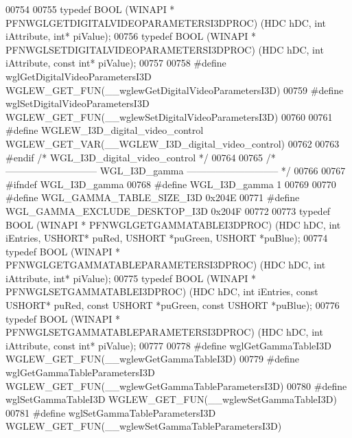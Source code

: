 \begin{DoxyCode}
00754 
00755 \textcolor{keyword}{typedef} BOOL (WINAPI * PFNWGLGETDIGITALVIDEOPARAMETERSI3DPROC) (HDC hDC, \textcolor{keywordtype}{int} 
      iAttribute, \textcolor{keywordtype}{int}* piValue);
00756 \textcolor{keyword}{typedef} BOOL (WINAPI * PFNWGLSETDIGITALVIDEOPARAMETERSI3DPROC) (HDC hDC, \textcolor{keywordtype}{int} 
      iAttribute, \textcolor{keyword}{const} \textcolor{keywordtype}{int}* piValue);
00757 
00758 \textcolor{preprocessor}{#define wglGetDigitalVideoParametersI3D WGLEW\_GET\_FUN(\_\_wglewGetDigitalVideoParametersI3D)}
00759 \textcolor{preprocessor}{#define wglSetDigitalVideoParametersI3D WGLEW\_GET\_FUN(\_\_wglewSetDigitalVideoParametersI3D)}
00760 
00761 \textcolor{preprocessor}{#define WGLEW\_I3D\_digital\_video\_control WGLEW\_GET\_VAR(\_\_WGLEW\_I3D\_digital\_video\_control)}
00762 
00763 \textcolor{preprocessor}{#endif }\textcolor{comment}{/* WGL\_I3D\_digital\_video\_control */}\textcolor{preprocessor}{}
00764 
00765 \textcolor{comment}{/* ----------------------------- WGL\_I3D\_gamma ----------------------------- */}
00766 
00767 \textcolor{preprocessor}{#ifndef WGL\_I3D\_gamma}
00768 \textcolor{preprocessor}{#define WGL\_I3D\_gamma 1}
00769 
00770 \textcolor{preprocessor}{#define WGL\_GAMMA\_TABLE\_SIZE\_I3D 0x204E}
00771 \textcolor{preprocessor}{#define WGL\_GAMMA\_EXCLUDE\_DESKTOP\_I3D 0x204F}
00772 
00773 \textcolor{keyword}{typedef} BOOL (WINAPI * PFNWGLGETGAMMATABLEI3DPROC) (HDC hDC, \textcolor{keywordtype}{int} iEntries, USHORT* 
      puRed, USHORT *puGreen, USHORT *puBlue);
00774 \textcolor{keyword}{typedef} BOOL (WINAPI * PFNWGLGETGAMMATABLEPARAMETERSI3DPROC) (HDC hDC, \textcolor{keywordtype}{int} 
      iAttribute, \textcolor{keywordtype}{int}* piValue);
00775 \textcolor{keyword}{typedef} BOOL (WINAPI * PFNWGLSETGAMMATABLEI3DPROC) (HDC hDC, \textcolor{keywordtype}{int} iEntries, \textcolor{keyword}{const} USHORT* 
      puRed, \textcolor{keyword}{const} USHORT *puGreen, \textcolor{keyword}{const} USHORT *puBlue);
00776 \textcolor{keyword}{typedef} BOOL (WINAPI * PFNWGLSETGAMMATABLEPARAMETERSI3DPROC) (HDC hDC, \textcolor{keywordtype}{int} 
      iAttribute, \textcolor{keyword}{const} \textcolor{keywordtype}{int}* piValue);
00777 
00778 \textcolor{preprocessor}{#define wglGetGammaTableI3D WGLEW\_GET\_FUN(\_\_wglewGetGammaTableI3D)}
00779 \textcolor{preprocessor}{#define wglGetGammaTableParametersI3D WGLEW\_GET\_FUN(\_\_wglewGetGammaTableParametersI3D)}
00780 \textcolor{preprocessor}{#define wglSetGammaTableI3D WGLEW\_GET\_FUN(\_\_wglewSetGammaTableI3D)}
00781 \textcolor{preprocessor}{#define wglSetGammaTableParametersI3D WGLEW\_GET\_FUN(\_\_wglewSetGammaTableParametersI3D)}

\end{DoxyCode}
